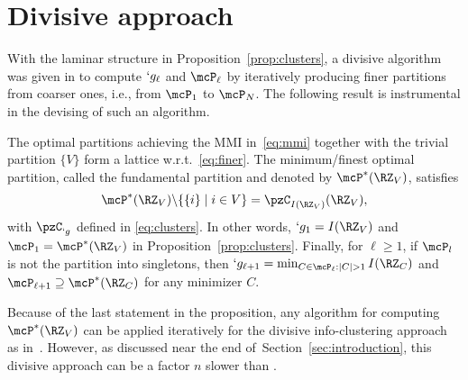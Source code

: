 \section{Divisive approach}
\label{sec:divisive}

With the laminar structure in Proposition~\ref{prop:clusters}, a divisive algorithm was given in \cite{chan16cluster} to
compute $`g_\ell$ and $\mcP_{\ell}$ by iteratively producing finer partitions from coarser ones,
i.e., from $\mcP_1$ to $\mcP_N$. 
The following result is instrumental in the devising of such an algorithm.
%
\begin{Proposition}
	\label{prop:fund:cluster}
	The optimal partitions achieving the MMI in~\eqref{eq:mmi} together with the trivial partition $\{V\}$ form a
	lattice w.r.t.\ \eqref{eq:finer}. The minimum/finest optimal partition,
	called the fundamental partition and denoted by $\mcP^{*}(\RZ_V)$, satisfies 
	\begin{align*}
		\mcP^{*}(\RZ_V) \backslash \{\{i\}\mid i\in V\} = \pzC_{I(\RZ_V)}(\RZ_V),
	\end{align*}
	with $\pzC_{`g}$ defined in \eqref{eq:clusters}.
	In other words,  $`g_1 = I(\RZ_V)$ and $\mcP_{1} = \mcP^{*}(\RZ_V)$ in
	Proposition~\ref{prop:clusters}. Finally, for $\ell \geq 1$,
	if $\mcP_l$ is not the partition into singletons,
	then $`g_{\ell +1} = \min\nolimits_{C\in \mcP_{\ell}:\abs{C}> 1}I(\RZ_C)$ and
	$\mcP_{\ell+1}\supseteq \mcP^*(\RZ_C)$ for any minimizer $C$.
\end{Proposition}
Because of the last statement in the proposition, any algorithm for computing $\mcP^{*}(\RZ_V)$ can
be applied iteratively for the divisive info-clustering approach as in~\cite[Algorithm~2]{chan16cluster}.
However,
as discussed near the end of~Section~\ref{sec:introduction},
this divisive approach can be a factor $n$ slower than \cite[Algorithm~3]{chan16cluster}.

